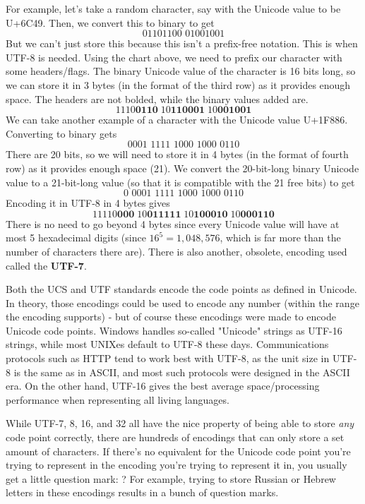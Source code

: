     For example, let's take a random character, say with the Unicode value to be U+6C49. Then, we convert this to binary to get
    \[\text{01101100 01001001}\]
    But we can't just store this because this isn't a prefix-free notation. This is when UTF-8 is needed. Using the chart above, we need to prefix our character with some headers/flags. The binary Unicode value of the character is 16 bits long, so we can store it in 3 bytes (in the format of the third row) as it provides enough space. The headers are not bolded, while the binary values added are. 
    \[\text{1110}\textbf{0110} \; \text{10}\textbf{110001} \; \text{10}\textbf{001001}\]
    We can take another example of a character with the Unicode value U+1F886. Converting to binary gets
    \[\text{0001 1111 1000 1000 0110}\]
    There are 20 bits, so we will need to store it in 4 bytes (in the format of fourth row) as it provides enough space (21). We convert the 20-bit-long binary Unicode value to a 21-bit-long value (so that it is compatible with the 21 free bits) to get
    \[\text{0 0001 1111 1000 1000 0110}\]
    Encoding it in UTF-8 in 4 bytes gives
    \[\text{11110}\textbf{000} \; \text{10}\textbf{011111} \;  \text{10}\textbf{100010} \; \text{10}\textbf{000110}\]
    There is no need to go beyond 4 bytes since every Unicode value will have at most 5 hexadecimal digits (since $16^5 = 1,048,576$, which is far more than the number of characters there are). There is also another, obsolete, encoding used called the \textbf{UTF-7}. 

    Both the UCS and UTF standards encode the code points as defined in Unicode. In theory, those encodings could be used to encode any number (within the range the encoding supports) - but of course these encodings were made to encode Unicode code points. Windows handles so-called "Unicode" strings as UTF-16 strings, while most UNIXes default to UTF-8 these days. Communications protocols such as HTTP tend to work best with UTF-8, as the unit size in UTF-8 is the same as in ASCII, and most such protocols were designed in the ASCII era. On the other hand, UTF-16 gives the best average space/processing performance when representing all living languages. 

    While UTF-7, 8, 16, and 32 all have the nice property of being able to store \textit{any} code point correctly, there are hundreds of encodings that can only store a set amount of characters. If there’s no equivalent for the Unicode code point you’re trying to represent in the encoding you’re trying to represent it in, you usually get a little question mark: ? For example, trying to store Russian or Hebrew letters in these encodings results in a bunch of question marks. 

